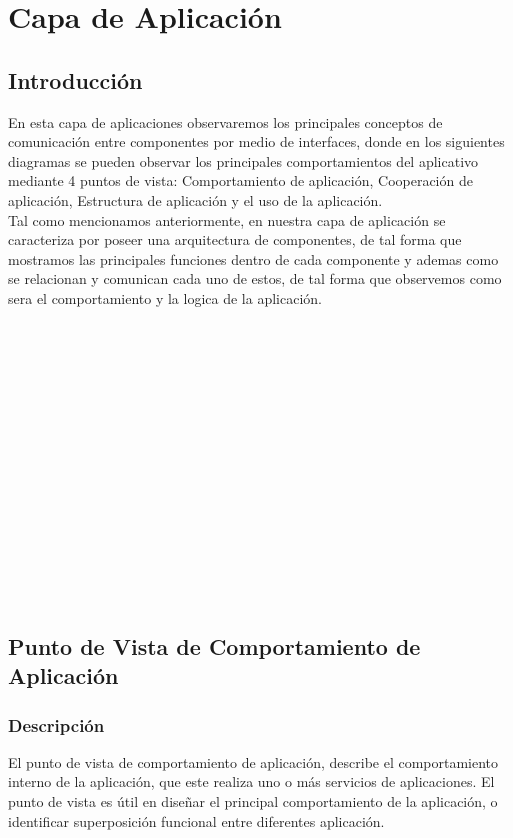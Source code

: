 \chapter{Capa de Aplicación}

\section{Introducción}
En esta capa de aplicaciones observaremos los principales conceptos de comunicación entre componentes por medio de interfaces, donde en los siguientes diagramas se pueden observar los principales comportamientos del aplicativo mediante 4 puntos de vista: Comportamiento de aplicación, Cooperación de aplicación, Estructura de aplicación y el uso de la aplicación.\\
Tal como mencionamos anteriormente, en nuestra capa de aplicación se caracteriza por poseer una arquitectura de componentes, de tal forma que  mostramos las principales funciones dentro de cada componente y ademas como se relacionan y comunican cada uno de estos, de tal forma que observemos como sera el comportamiento y la logica de la aplicación.\\
\\
\\
\\
\\
\\
\\
\\
\\
\\
\\
\\
\\
\\
\\
\\
\section{Punto de Vista de Comportamiento de Aplicación}
\subsection{Descripción}
El punto de vista de comportamiento de aplicación, describe el comportamiento interno de la aplicación, que este realiza uno o más servicios de aplicaciones. El punto de vista es útil en diseñar el principal comportamiento de la aplicación, o identificar superposición funcional entre diferentes aplicación.

